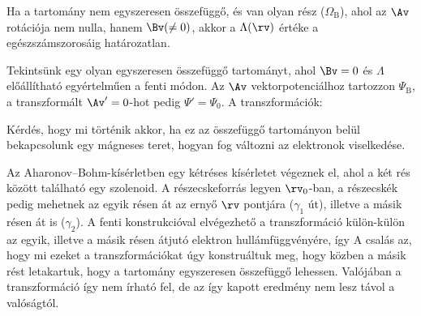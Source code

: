    Ha a tartomány nem egyszeresen összefüggő, és van olyan rész ($\Omega_\text{B}$), ahol az $\Av$ rotációja nem nulla, hanem $\Bv(\ne 0)$, akkor a $\Lambda(\rv)$ értéke a
   egészszámszorosáig határozatlan. 
   
   Tekintsünk egy olyan egyszeresen összefüggő tartományt, ahol $\Bv=0$ és $\Lambda$ előállítható egyértelműen a fenti módon.
   Az $\Av$ vektorpotenciálhoz tartozzon $\Psi_\text{B}$, a transzformált $\Av'=0$-hot pedig $\Psi'=\Psi_0$.
   A transzformációk:
   
   Kérdés, hogy mi történik akkor, ha ez az összefüggő tartományon belül bekapcsolunk egy mágneses teret, hogyan fog változni az elektronok viselkedése. 
   
   Az Aharonov--Bohm-kísérletben egy kétréses kísérletet végeznek el, ahol a két rés között található egy szolenoid.
   A részecskeforrás legyen $\rv_0$-ban, a részecskék pedig mehetnek az egyik résen át az ernyő $\rv$ pontjára ($\gamma_1$ út), illetve a másik résen át is ($\gamma_2$).
   A fenti konstrukcióval elvégezhető a transzformáció külön-külön az egyik, illetve a másik résen átjutó elektron hullámfüggvényére, így
   A csalás az, hogy mi ezeket a transzformációkat úgy konstruáltuk meg, hogy közben a másik rést letakartuk, hogy a tartomány egyszeresen összefüggő lehessen.
   Valójában a transzformáció így nem írható fel, de az így kapott eredmény nem lesz távol a valóságtól.
   
